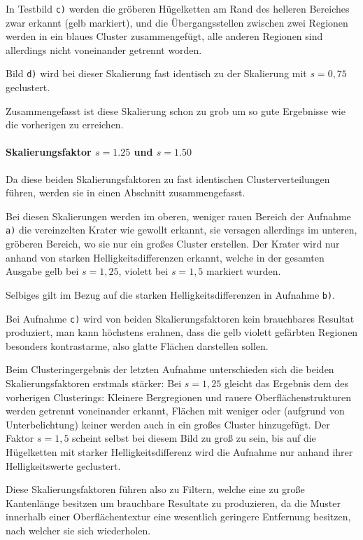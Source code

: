 In Testbild \texttt{c)} werden die gröberen Hügelketten am Rand des helleren Bereiches zwar erkannt (gelb markiert), und die Übergangsstellen zwischen zwei Regionen werden in ein blaues Cluster zusammengefügt, alle anderen Regionen sind allerdings nicht voneinander getrennt worden.

Bild \texttt{d)} wird bei dieser Skalierung fast identisch zu der Skalierung mit $s=0,75$ geclustert.

Zusammengefasst ist diese Skalierung schon zu grob um so gute Ergebnisse wie die vorherigen zu erreichen.

\paragraph{Skalierungsfaktor $s=1.25$ und $s=1.50$}

Da diese beiden Skalierungsfaktoren zu fast identischen Clusterverteilungen führen, werden sie in einen Abschnitt zusammengefasst.

Bei diesen Skalierungen werden im oberen, weniger rauen Bereich der Aufnahme \texttt{a)} die vereinzelten Krater wie gewollt erkannt, sie versagen allerdings im unteren, gröberen Bereich, wo sie nur ein großes Cluster erstellen. Der Krater wird nur anhand von starken Helligkeitsdifferenzen erkannt, welche in der gesamten Ausgabe gelb bei $s=1,25$, \bzw violett bei $s=1,5$ markiert wurden. 

Selbiges gilt im Bezug auf die starken Helligkeitsdifferenzen in Aufnahme \texttt{b)}.

Bei Aufnahme \texttt{c)} wird von beiden Skalierungsfaktoren kein brauchbares Resultat produziert, man kann höchstens erahnen, dass die gelb \bzw violett gefärbten Regionen besonders kontrastarme, also glatte Flächen darstellen sollen.

Beim Clusteringergebnis der letzten Aufnahme unterschieden sich die beiden Skalierungsfaktoren erstmals stärker: Bei $s=1,25$ gleicht das Ergebnis dem des vorherigen Clusterings: Kleinere Bergregionen und rauere Oberflächenstrukturen werden getrennt voneinander erkannt, Flächen mit weniger oder (aufgrund von Unterbelichtung) keiner werden auch in ein großes Cluster hinzugefügt. Der Faktor $s=1,5$ scheint selbst bei diesem Bild zu groß zu sein, bis auf die Hügelketten mit starker Helligkeitsdifferenz wird die Aufnahme nur anhand ihrer Helligkeitswerte geclustert.

Diese Skalierungsfaktoren führen also zu Filtern, welche eine zu große Kantenlänge besitzen um brauchbare Resultate zu produzieren, da die Muster innerhalb einer Oberflächentextur eine wesentlich geringere Entfernung besitzen, nach welcher sie sich wiederholen.

